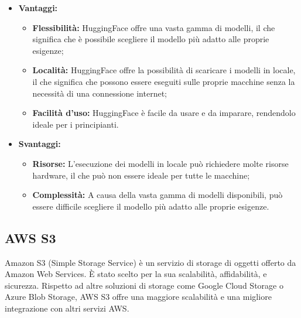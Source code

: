 \documentclass[10pt, a4paper]{article}
\begin{document}
\begin{itemize}
\item \textbf{Vantaggi:}
\begin{itemize}
\item \textbf{Flessibilità:} HuggingFace offre una vasta gamma di modelli, il che significa che è possibile scegliere il modello più adatto alle proprie esigenze;
\item \textbf{Località:} HuggingFace offre la possibilità di scaricare i modelli in locale, il che significa che possono essere eseguiti sulle proprie macchine senza la necessità di una connessione internet;
\item \textbf{Facilità d'uso:} HuggingFace è facile da usare e da imparare, rendendolo ideale per i principianti.
\end{itemize}
\item \textbf{Svantaggi:}
\begin{itemize}
\item \textbf{Risorse:} L'esecuzione dei modelli in locale può richiedere molte risorse hardware, il che può non essere ideale per tutte le macchine;
\item \textbf{Complessità:} A causa della vasta gamma di modelli disponibili, può essere difficile scegliere il modello più adatto alle proprie esigenze.
\end{itemize}
\end{itemize}

\subsection{AWS S3}
Amazon S3 (Simple Storage Service) è un servizio di storage di oggetti offerto da Amazon Web Services. È stato scelto per la sua scalabilità, affidabilità, e sicurezza. Rispetto ad altre soluzioni di storage come Google Cloud Storage o Azure Blob Storage, AWS S3 offre una maggiore scalabilità e una migliore integrazione con altri servizi AWS.
\end{document}
